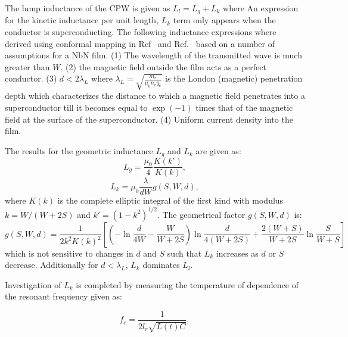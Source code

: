 The lump inductance of the CPW is given as $L_{l} = L_{g}+L_{k}$ where 
An expression for the kinetic inductance per unit length, $L_{k}$ term only appears when the conductor is superconducting. The following inductance expressions where derived using conformal mapping in Ref~\citep{1347-4065-33-10R-5708} and Ref.~\citep{402973} based on a number of assumptions for a NbN film. (1) The wavelength of the transmitted wave is much greater than $W$. (2)  the magnetic field outside the film acts as a perfect conductor. (3) $d < 2 \lambda_{L}$ where $\lambda_{L}=\sqrt{\frac{m_{e}}{\mu_{0} n_{e}q_{e}}}$  is the London (magnetic) penetration depth which characterizes the distance to which a magnetic field penetrates into a superconductor till it becomes equal to $\exp(-1)$ times that of the magnetic field at the surface of the superconductor. (4) Uniform current density into the film. 

The results for the geometric inductance $L_{g}$ and $L_{k}$ are given as:
 \begin{equation}
\label{eq:geometricinductance}
L_{g} = \frac{\mu_{0}}{4}\frac{K(k')}{K(k)},
\end{equation}
\begin{equation}
\label{eq:kineticcapacitance}
L_{k} = \mu_{0}\frac{\lambda}{dW} g(S,W,d),
\end{equation} 
\noindent where $K(k)$ is the complete elliptic integral of the first kind with modulus $k = W /(W + 2S)$ and $k'=(1-k^{2})^{1/2}$. The geometrical factor $g(S , W, d)$ is:
\begin{equation}
\label{eq:geometricfactor}
g(S,W,d) = \frac{1}{2k^{2}K(k)^{2}} \left [ \left ( -\ln{\frac{d}{4 W}}-\frac{W}{W+2S} \right ) \ln{\frac{d}{4(W+2S)}} + \frac{2(W+S)}{W+2S} \ln{\frac{S}{W+S}} \right ]
\end{equation}
\noindent which is not sensitive to changes in $d$ and $S$ such that $L_{k}$ increases as $d$ or $S$ decrease.  Additionally for $d < \lambda_{L}$, $L_{k}$ dominates $L_{l}$. 
 
 Investigation of $L_{k}$ is completed by measuring the temperature of dependence of the resonant frequency given as:   
 
\begin{equation}
\label{eq:tempresonantfrequency}
f_{c}=\frac{1}{2 l_{r} \sqrt{L(t)C}},
\end{equation}

